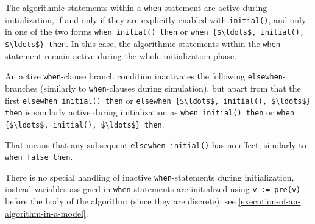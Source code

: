 The algorithmic statements within a \lstinline!when!-statement are active during initialization, if and only if they are explicitly enabled with \lstinline!initial()!, and only in one of the two forms \lstinline!when initial() then! or \lstinline!when {$\ldots$, initial(), $\ldots$} then!.
In this case, the algorithmic statements within the \lstinline!when!-statement remain active during the whole initialization phase.

An active \lstinline!when!-clause branch condition inactivates the following \lstinline!elsewhen!-branches (similarly to \lstinline!when!-clauses during simulation), but apart from that the first \lstinline!elsewhen initial() then! or \lstinline!elsewhen {$\ldots$, initial(), $\ldots$} then! is similarly active during initialization as \lstinline!when initial() then! or \lstinline!when {$\ldots$, initial(), $\ldots$} then!.

\begin{nonnormative}
That means that any subsequent \lstinline!elsewhen initial()! has no effect, similarly to \lstinline!when false then!.
\end{nonnormative}

\begin{nonnormative}
There is no special handling of inactive \lstinline!when!-statements during initialization, instead variables assigned in \lstinline!when!-statements are initialized using \lstinline!v := pre(v)! before the body of the algorithm (since they are discrete), see \cref{execution-of-an-algorithm-in-a-model}.
\end{nonnormative}

